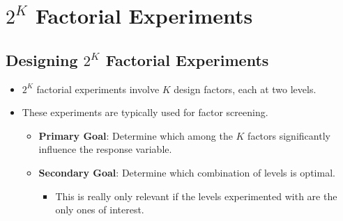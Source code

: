 \chapter{\texorpdfstring{$ 2^K $}{2K} Factorial Experiments}
\section{Designing \texorpdfstring{$ 2^K $}{2K} Factorial Experiments}
\begin{itemize}[*]
    \item $ 2^K $ factorial experiments involve $ K $ design factors, each at two levels.
\end{itemize}
\begin{itemize}
    \item These experiments are typically used for factor screening.
          \begin{itemize}[$\rightarrow$]
              \item \textbf{Primary Goal}: Determine which among the $ K $ factors significantly influence the response variable.
              \item \textbf{Secondary Goal}: Determine which combination of levels is optimal.
                    \begin{itemize}[$\hookrightarrow$]
                        \item This is really only relevant if the levels experimented with are the only ones of interest.
                    \end{itemize}
          \end{itemize}
\end{itemize}

